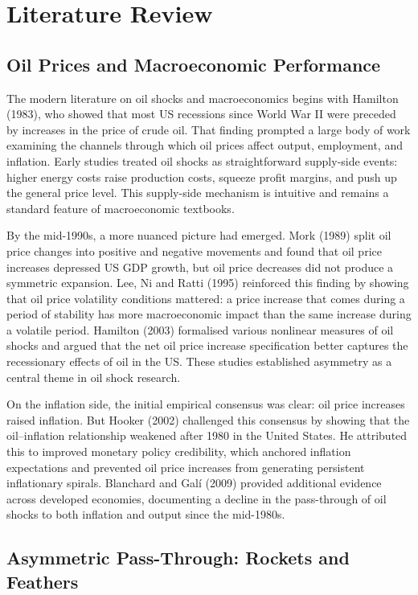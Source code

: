 \chapter{Literature Review}
\label{ch:literature}

\section{Oil Prices and Macroeconomic Performance}

The modern literature on oil shocks and macroeconomics begins with Hamilton (1983), who showed that most US recessions since World War II were preceded by increases in the price of crude oil. That finding prompted a large body of work examining the channels through which oil prices affect output, employment, and inflation. Early studies treated oil shocks as straightforward supply-side events: higher energy costs raise production costs, squeeze profit margins, and push up the general price level. This supply-side mechanism is intuitive and remains a standard feature of macroeconomic textbooks.

By the mid-1990s, a more nuanced picture had emerged. Mork (1989) split oil price changes into positive and negative movements and found that oil price increases depressed US GDP growth, but oil price decreases did not produce a symmetric expansion. Lee, Ni and Ratti (1995) reinforced this finding by showing that oil price volatility conditions mattered: a price increase that comes during a period of stability has more macroeconomic impact than the same increase during a volatile period. Hamilton (2003) formalised various nonlinear measures of oil shocks and argued that the net oil price increase specification better captures the recessionary effects of oil in the US. These studies established asymmetry as a central theme in oil shock research.

On the inflation side, the initial empirical consensus was clear: oil price increases raised inflation. But Hooker (2002) challenged this consensus by showing that the oil--inflation relationship weakened after 1980 in the United States. He attributed this to improved monetary policy credibility, which anchored inflation expectations and prevented oil price increases from generating persistent inflationary spirals. Blanchard and Gal\'{i} (2009) provided additional evidence across developed economies, documenting a decline in the pass-through of oil shocks to both inflation and output since the mid-1980s.

\section{Asymmetric Pass-Through: Rockets and Feathers}

